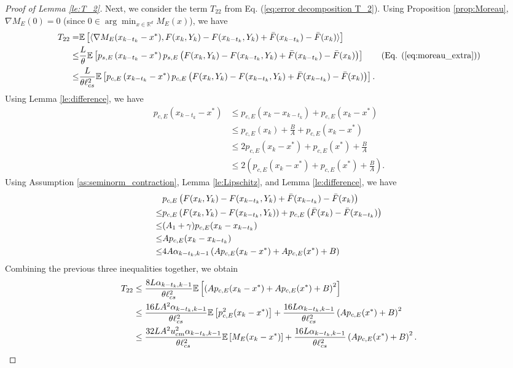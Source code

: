 \documentclass[11 pt]{article}
\begin{document}
\begin{proof}[Proof of Lemma \ref{le:T_2}]
		Next, we consider the term $T_{22}$ from Eq. (\ref{eq:error decomposition T_2}). Using Proposition \ref{prop:Moreau}, $\nabla M_E(0) = 0$ (since $0 \in \arg\min_{x \in \mathbb{R}^d} M_E(x)$), we have
		\begin{align*}
			T_{22}=&\mathbb{E}\left[\langle\nabla M_E(x_{k-t_k}-x^*),F(x_k,Y_k)-F(x_{k-t_k}, Y_k)+\Bar{F}(x_{k-t_k})-\Bar{F}(x_{k})\rangle\right] \\
			\leq &\frac{L}{\theta} \mathbb{E}\left[p_{s,E}\left(x_{k-t_k}-x^*\right) p_{s,E}\left(F(x_k,Y_k)-F(x_{k-t_k}, Y_k)+\Bar{F}(x_{k-t_k})-\Bar{F}(x_{k})\right)\right]\tag{Eq. (\ref{eq:moreau_extra})}\\
			\leq & \frac{L}{\theta \ell^2_{cs}} \mathbb{E}\left[p_{c,E}\left(x_{k-t_k}-x^*\right) p_{c,E}\left(F(x_k,Y_k)-F(x_{k-t_k}, Y_k)+\Bar{F}(x_{k-t_k})-\Bar{F}(x_{k})\right)\right].
		\end{align*}
		Using Lemma \ref{le:difference}, we have
		\begin{align*}
			p_{c,E}\left(x_{k-t_k}-x^*\right) &\leq p_{c,E}\left(x_k - x_{k-t_k}\right) + p_{c,E}\left(x_k-x^*\right)\\
			&\leq p_{c,E}(x_{k})+\frac{B}{A} + p_{c,E}\left(x_k-x^*\right)\\
			&\leq 2 p_{c,E}(x_{k} - x^*) + p_{c,E}(x^*) + \frac{B}{A} \\
			&\leq 2\left(p_{c,E}(x_{k} - x^*) + p_{c,E}(x^*) + \frac{B}{A}\right).
		\end{align*}
		Using Assumption \ref{as:seminorm_contraction}, Lemma \ref{le:Lipschitz}, and Lemma \ref{le:difference}, we have
		\begin{align*}
			& p_{c,E}\left(F(x_k,Y_k)-F(x_{k-t_k}, Y_k)+\Bar{F}(x_{k-t_k})-\Bar{F}(x_{k})\right)\\
			\leq & p_{c,E}\left(F(x_k,Y_k)-F(x_{k-t_k}, Y_k)\right) + p_{c,E}\left(\Bar{F}(x_{k}) - \Bar{F}(x_{k-t_k})\right)\\
			\leq & (A_1+\gamma) p_{c,E}(x_k-x_{k-t_k})\\
			\leq & A p_{c,E}(x_k-x_{k-t_k})\\
			\leq & 4A\alpha_{k-t_k, k-1}\left(Ap_{c,E}(x_{k} - x^*)+Ap_{c,E}(x^*)+B\right)
		\end{align*}
		Combining the previous three inequalities together, we obtain
		\begin{align}\label{eq:T_{22} bound}
			T_{22} &\leq \frac{8L\alpha_{k-t_k, k-1}}{\theta \ell^2_{cs}}\mathbb{E}\left[\left(Ap_{c,E}(x_{k} - x^*)+Ap_{c,E}(x^*)+B\right)^2\right]\nonumber\\  
			&\leq \frac{16LA^2\alpha_{k-t_k, k-1}}{\theta \ell^2_{cs}}\mathbb{E}\left[p^2_{c,E}(x_{k} - x^*)\right] + \frac{16L\alpha_{k-t_k, k-1}}{\theta \ell^2_{cs}}\left(Ap_{c,E}(x^*)+B\right)^2\nonumber\\
			&\leq \frac{32LA^2u^2_{cm}\alpha_{k-t_k, k-1}}{\theta \ell^2_{cs}}\mathbb{E}\left[M_{E}(x_{k} - x^*)\right] + \frac{16L\alpha_{k-t_k, k-1}}{\theta \ell^2_{cs}}\left(Ap_{c,E}(x^*)+B\right)^2.
		\end{align}
		

\end{proof}
\end{document}
